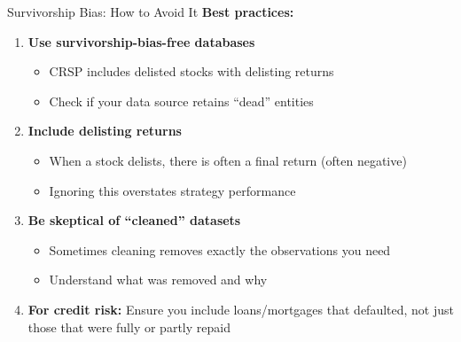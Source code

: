 \documentclass[10pt]{beamer}
\begin{document}
\begin{frame}{Survivorship Bias: How to Avoid It}
  \textbf{Best practices:}
  
  \vspace{0.5em}
  \begin{enumerate}
    \item \textbf{Use survivorship-bias-free databases}
    \begin{itemize}
      \item CRSP includes delisted stocks with delisting returns
      \item Check if your data source retains ``dead'' entities
    \end{itemize}
    \vspace{0.3em}
    \item \textbf{Include delisting returns}
    \begin{itemize}
      \item When a stock delists, there is often a final return (often negative)
      \item Ignoring this overstates strategy performance
    \end{itemize}
    \vspace{0.3em}
    \item \textbf{Be skeptical of ``cleaned'' datasets}
    \begin{itemize}
      \item Sometimes cleaning removes exactly the observations you need
      \item Understand what was removed and why
    \end{itemize}
    \vspace{0.3em}
    \item \textbf{For credit risk:} Ensure you include loans/mortgages that defaulted, not just those that were fully or partly repaid
  \end{enumerate}
\end{frame}
\end{document}
